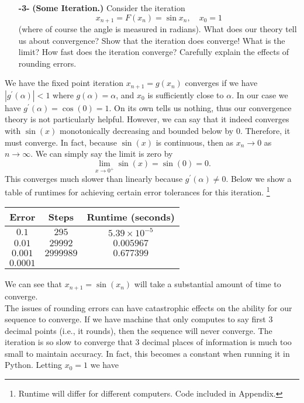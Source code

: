 \documentclass[11pt]{article}
\theoremstyle{definition}
\newcommand{\1}[1]{\mathbf{1} \left \{ #1 \right \}}
\begin{document}
\begin{itemize}
    \item[{\textbf{-3-}}] \textbf{(Some Iteration.)}  Consider the iteration
    \begin{equation}
        x_{n+1} = F(x_n) = \sin x_n, \quad x_0 = 1
    \end{equation}
    (where of course the angle is measured in radians).  What does our theory tell us about convergence? Show that the iteration does converge!  What is the limit?  How fast does the iteration converge?  Carefully explain the effects of rounding errors.
\end{itemize}
We have the fixed point iteration $x_{n+1} = g(x_n)$ converges if we have \(\left|g^{\prime} (\alpha)\right| < 1\) where $g(\alpha) = \alpha$, and $x_0$ is sufficiently close to $\alpha$.  In our case we have $g^{\prime} (\alpha) = \cos (0) = 1$.  On its own tells us nothing, thus our convergence theory is not particularly helpful.  However, we can say that it indeed converges with $\sin (x)$ monotonically decreasing and bounded below by $0$.  Therefore, it must converge.  In fact, because $\sin (x)$ is continuous, then as $x_n \rightarrow 0$ as $n \rightarrow \infty$.  We can simply say the limit is zero by
\[\lim_{x \rightarrow 0^+} \sin (x) = \sin (0) = 0.\]
This converges much slower than linearly because $g^{\prime} (\alpha) \neq 0$.  Below we show a table of runtimes for achieving certain error tolerances for this iteration.  \footnote{Runtime will differ for different computers.  Code included in Appendix.}
\begin{center}
\begin{tabular}{ |c|c|c| }
\hline
Error & Steps & Runtime (seconds) \\
\hline
$0.1$ & $295$ & $5.39 \times 10^{-5}$ \\
$0.01$ & $29992$ & $0.005967$ \\
$0.001$ & $2999989$ & $0.677399$ \\
$0.0001$ &  &  \\
\hline
\end{tabular}
\end{center}
We can see that $x_{n+1} = \sin (x_n)$ will take a substantial amount of time to converge.
\\
The issues of rounding errors can have catastrophic effects on the ability for our sequence to converge.  If we have machine that only computes to say first $3$ decimal points (i.e., it rounds), then the sequence will never converge.  The iteration is so slow to converge that $3$ decimal places of information is much too small to maintain accuracy.  In fact, this becomes a constant when running it in Python.  Letting $x_0 = 1$ we have
\end{document}
